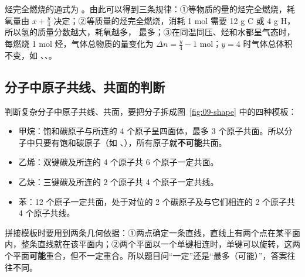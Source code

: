 烃完全燃烧的通式为 。由此可以得到三条规律：①等物质的量的烃完全燃烧，耗氧量由 $x+\frac y4$ 决定；②等质量的烃完全燃烧，消耗 1 mol  需要 12 g C 或 4 g H，所以氢的质量分数越大，耗氧越多， 最多；③在同温同压、烃和水都呈气态时，每燃烧 1 mol 烃，气体总物质的量变化为 $\Delta n=\frac y4-1$ mol；$y=4$ 时气体总体积不变，如 、、。

\subsection{分子中原子共线、共面的判断}
判断复杂分子中原子共线、共面，要把分子拆成图~\ref{fig:09-shape} 中的四种模板：
\begin{itemize}
\item 甲烷：饱和碳原子与所连的 4 个原子呈四面体，最多 3 个原子共面。所以分子中只要有饱和碳原子（如 、），所有原子就\textbf{不可能}共面。
\item 乙烯：双键碳及所连的 4 个原子共 6 个原子一定共面。
\item 乙炔：三键碳及所连的 2 个原子共 4 个原子一定共线。
\item 苯：12 个原子一定共面，处于对位的 2 个碳原子及与它们相连的 2 个原子共 4 个原子共线。
\end{itemize}
拼接模板时要用到两条几何依据：①两点确定一条直线，直线上有两个点在某平面内，整条直线就在该平面内；②两个平面以一个单键相连时，单键可以旋转，这两个平面\textbf{可能}重合，但不一定重合。所以题目问“一定”还是“最多（可能）”，答案往往不同。

